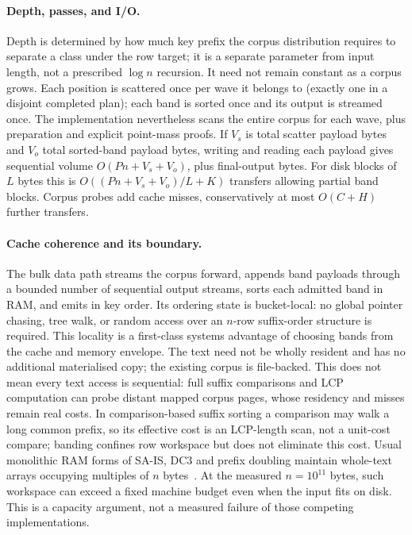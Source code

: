 \documentclass[10pt]{article}
\newcommand{\qnum}[2]{#2}
\begin{document}
\paragraph{Depth, passes, and I/O.}
Depth is determined by how much key prefix the corpus distribution requires to
separate a class under the row target; it is a separate parameter from input
length, not a prescribed $\log n$ recursion. It need not remain constant as a
corpus grows. Each position is scattered once per wave it belongs to (exactly
one in a disjoint completed plan); each band is sorted once and its output is
streamed once. The implementation nevertheless scans the entire corpus for each
wave, plus preparation and explicit point-mass proofs. If $V_s$ is total scatter
payload bytes and $V_o$ total sorted-band payload bytes, writing and reading each
payload gives sequential volume $O(Pn+V_s+V_o)$, plus final-output bytes.
For disk blocks of $L$ bytes this is $O((Pn+V_s+V_o)/L+K)$ transfers allowing
partial band blocks. Corpus probes add cache misses, conservatively at most
$O(C+H)$ further transfers.

\paragraph{Cache coherence and its boundary.}
The bulk data path streams the corpus forward, appends band payloads through a
bounded number of sequential output streams, sorts each admitted band in RAM,
and emits in key order. Its ordering state is bucket-local: no global pointer
chasing, tree walk, or random access over an $n$-row suffix-order structure is
required. This locality is a first-class systems advantage of choosing bands
from the cache and memory envelope. The text need not be wholly resident and
has no additional materialised copy; the existing corpus is file-backed.
This does not mean every text access is sequential: full suffix comparisons and
LCP computation can probe distant mapped corpus pages, whose residency and
misses remain real costs. In comparison-based suffix sorting a comparison may
walk a long common prefix, so its effective cost is an LCP-length scan, not a
unit-cost compare; banding confines row workspace but does not eliminate this
cost. Usual monolithic RAM forms of SA-IS, DC3 and prefix doubling maintain
whole-text arrays occupying multiples of $n$ bytes~\cite{sais,dc3,sa}.
At the measured $n=\qnum{input}{10^{11}}$ bytes, such workspace can exceed a fixed
machine budget even when the input fits on disk. This is a capacity argument,
not a measured failure of those competing implementations.
\end{document}
